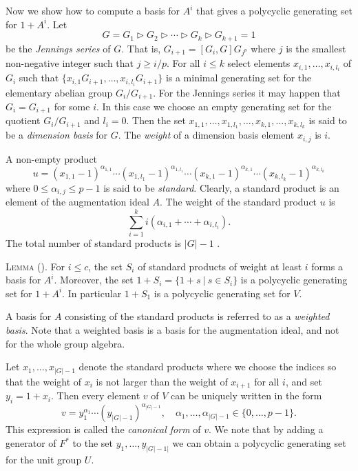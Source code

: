 \documentclass[a4paper,11pt]{report}
\begin{document}
{{    Now we show how to compute a basis for $A^i$ that gives a polycyclic generating set for $1+A^i$. Let 
\[ G=G_1 \rhd G_2\rhd\cdots\rhd G_{k}\rhd G_{k+1}=1 \]
 be the \emph{Jennings series} of $G$. That is, $G_{i+1}=[G_i,G]G_{j^p}$ where $j$ is the smallest non-negative integer such that $j\geq i/p$. For all $i\leq k$ select elements $x_{i,1},\ldots,x_{i,l_i}$ of $G_i$ such that $\{x_{i,1}G_{i+1},\ldots,x_{i,l_i}G_{i+1}\}$ is a minimal generating set for the elementary abelian group $G_i/G_{i+1}$. For the Jennings series it may happen that $G_i=G_{i+1}$ for some $i$. In this case we choose an empty generating set for the quotient $G_i/G_{i+1}$ and $l_i=0$. Then the set $x_{1,1},\ldots,x_{1,l_1},\ldots,x_{k,1},\ldots,x_{k,l_k}$ is said to be a \emph{dimension basis} for $G$. The \emph{weight} of a dimension basis element $x_{i,j}$ is $i$.

  A non-empty product 
\[ u=(x_{1,1}-1)^{\alpha_{1,1}}\cdots(x_{1,l_1}-1)^{\alpha_{1,l_1}}\cdots
(x_{k,1}-1)^{\alpha_{k,1}}\cdots(x_{k,l_k}-1)^{\alpha_{k,l_k}} \]
 where $0\leq \alpha_{i,j}\leq p-1$ is said to be \emph{standard}. Clearly, a standard product is an element of the augmentation ideal $A$. The weight of the standard product $u$ is 
\[ \sum_{i=1}^k i(\alpha_{i,1}+\cdots+\alpha_{i,l_i}). \]
 The total number of standard products is $|G|-1$ . 

 \textsc{Lemma (}\cite[Theorem VIII.2.6]{HB}\textsc{).} For $i\leq c$, the set $S_i$ of standard products of weight at least $i$ forms a basis for $A^i$. Moreover, the set $1+S_i=\{1+s\ |\ s \in S_i\}$ is a polycyclic generating set for $1+A^i$. In particular $1+S_1$ is a polycyclic generating set for $V$. 

 A basis for $A$ consisting of the standard products is referred to as a \emph{weighted basis}. Note that a weighted basis is a basis for the augmentation ideal, and not
for the whole group algebra.

 Let $x_1,\ldots,x_{{|G|}-1}$ denote the standard products where we choose the indices so that the weight of $x_i$ is not larger than the weight of $x_{i+1}$ for all $i$, and set $y_i=1+x_i$. Then every element $v$ of $V$ can be uniquely written in the form 
\[ v=y_1^{\alpha_1}\cdots (y_{|G|-1})^{\alpha_{|G|-1}}, \quad
\alpha_1,\ldots,\alpha_{|G|-1} \in \{0,\ldots,p-1\}. \]
 This expression is called the \emph{canonical form} of $v$. We note that by adding a generator of $F^*$ to the set $y_1,\ldots,y_{|G|-1|}$ we can obtain a polycyclic generating set for the unit group $U$. }

}
\end{document}
